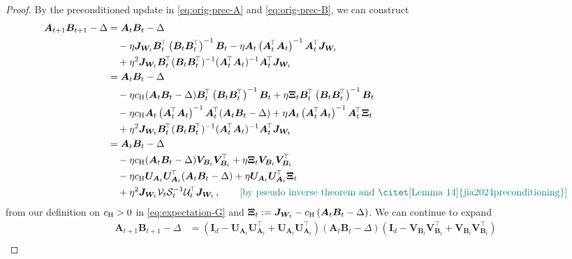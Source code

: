 \begin{proof}
By the preconditioned update in \cref{eq:orig-prec-A} and \cref{eq:orig-prec-B}, we can construct
\begin{align*}
    \bm A_{t+1}\bm B_{t+1} - \Delta & = \bm A_t \bm B_t - \Delta\\
    & \quad - \eta \bm J_{\bm W_t}\bm B_t^{\!\top}\left(\bm B_t\bm B_t^{\!\top}\right)^{-1}\bm B_t - \eta \bm A_t \left(\bm A_t^{\!\top}\bm A_t\right)^{-1}\bm A_t^{\!\top}\bm J_{\bm W_t}\\
    & \quad + \eta^2 \bm J_{\bm W_t} \bm B_t^{\!\top}(\bm B_t\bm B_t^{\!\top})^{-1}(\bm A_t^{\!\top}\bm A_t)^{-1}\bm A_t^{\!\top}\bm J_{\bm W_t}\\
    & = \bm A_t \bm B_t - \Delta\\
    & \quad - \eta c_{\rm H} (\bm A_t \bm B_t - \Delta)\bm B_t^{\!\top}\left(\bm B_t\bm B_t^{\!\top}\right)^{-1}\bm B_t + \eta \bm \Xi_t \bm B_t^{\!\top}\left(\bm B_t\bm B_t^{\!\top}\right)^{-1}\bm B_t\\
    & \quad - \eta c_{\rm H} \bm A_t \left(\bm A_t^{\!\top}\bm A_t\right)^{-1}\bm A_t^{\!\top}(\bm A_t \bm B_t - \Delta) + \eta \bm A_t \left(\bm A_t^{\!\top}\bm A_t\right)^{-1}\bm A_t^{\!\top} \bm \Xi_t\\
    & \quad + \eta^2 \bm J_{\bm W_t} \bm B_t^{\!\top}(\bm B_t\bm B_t^{\!\top})^{-1}(\bm A_t^{\!\top}\bm A_t)^{-1}\bm A_t^{\!\top}\bm J_{\bm W_t}\\
    & = \bm A_t \bm B_t - \Delta\\
    & \quad - \eta c_{\rm H} (\bm A_t \bm B_t - \Delta)\bm V_{\bm B_t} \bm V_{\bm B_t}^{\!\top} + \eta \bm \Xi_t \bm V_{\bm B_t} \bm V_{\bm B_t}^{\!\top}\\
    & \quad - \eta c_{\rm H} \bm U_{\bm A_t} \bm U_{\bm A_t}^{\!\top}(\bm A_t \bm B_t - \Delta) + \eta \bm U_{\bm A_t} \bm U_{\bm A_t}^{\!\top} \bm \Xi_t\\
    & \quad + \eta^2 \bm J_{\bm W_t} \mathcal{V}_t \mathcal{S}_t^{-1} \mathcal{U}^{\!\top}_t\bm J_{\bm W_t}\,,\tag*{\color{teal}[by pseudo inverse theorem and \citet[Lemma 14]{jia2024preconditioning}]}
\end{align*}
from our definition on $c_{\rm H}>0$ in \cref{eq:expectation-G} and $\bm \Xi_t := \bm J_{\bm W_t} - c_{\rm H}\left(\bm A_t \bm B_t - \Delta\right)$.
We can continue to expand
\begin{align*}
    \bm A_{t+1}\bm B_{t+1} - \Delta & = \left(\bm I_d - \bm U_{\bm A_t} \bm U_{\bm A_t}^{\!\top}+\bm U_{\bm A_t} \bm U_{\bm A_t}^{\!\top}\right)\left(\bm A_t \bm B_t - \Delta\right)\left(\bm I_d - \bm V_{\bm B_t} \bm V_{\bm B_t}^{\!\top} + \bm V_{\bm B_t} \bm V_{\bm B_t}^{\!\top}\right)\\

\end{align*}
\end{proof}
